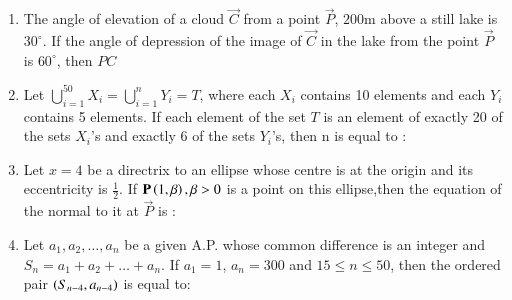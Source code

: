 \documentclass[journal]{IEEEtran}
\begin{document}
\begin{enumerate}[start=16]
\item The angle of elevation of a cloud $\vec{C}$ from a point $\vec{P}$, $200$m above a still lake is $30^{\circ}$. If the angle of depression of the image of $\vec{C}$ in the lake from the point $\vec{P}$ is $60^{\circ}$, then $PC$ 
\begin{enumerate}
\end{enumerate}

\item Let $\bigcup_{i=1}^{50} X_i = \bigcup_{i=1}^{n} Y_i = T$, where each $X_i$ contains 10 elements and each $Y_i$ contains 5 elements. If each element of the set $T$ is an element of exactly 20 of the sets $X_i$'s and exactly 6 of the sets $Y_i$'s, then  n is equal to :


\begin{enumerate}
\end{enumerate}

\item Let $x=4$ be a directrix to an ellipse whose centre is at the origin and its eccentricity is $\frac{1}{2}$. If $\mathbf{P}\left(1,\beta\right),\beta>0$ is a point on this ellipse,then the equation of the normal to it at $\vec{P}$ is :
\begin{enumerate}
\end{enumerate}

\item Let $a_1, a_2, \ldots, a_n$ be a given A.P. whose common difference is an integer and $S_n = a_1 + a_2 + \ldots + a_n$. If $a_1 = 1$, $a_n = 300$ and $15 \leq n \leq 50$, then the ordered pair  $\left(S_{n-4}, a_{n-4}\right)$ is equal to:


\end{enumerate}
\end{document}
